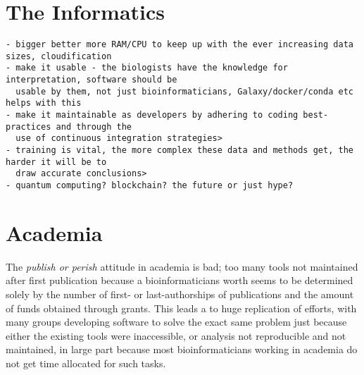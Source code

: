 \section{The Informatics}
\begin{verbatim}
- bigger better more RAM/CPU to keep up with the ever increasing data sizes, cloudification
- make it usable - the biologists have the knowledge for interpretation, software should be
  usable by them, not just bioinformaticians, Galaxy/docker/conda etc helps with this
- make it maintainable as developers by adhering to coding best-practices and through the
  use of continuous integration strategies>
- training is vital, the more complex these data and methods get, the harder it will be to
  draw accurate conclusions>
- quantum computing? blockchain? the future or just hype?
\end{verbatim}

\section{Academia}

The \textit{publish or perish} attitude in academia is bad; too many tools not maintained after first publication because a bioinformaticians worth seems to be determined solely by the number of first- or last-authorships of publications and the amount of funds obtained through grants. This leads a to huge replication of efforts, with many groups developing software to solve the exact same problem just because either the existing tools were inaccessible, or analysis not reproducible and not maintained, in large part because most bioinformaticians working in academia do not get time allocated for such tasks.

